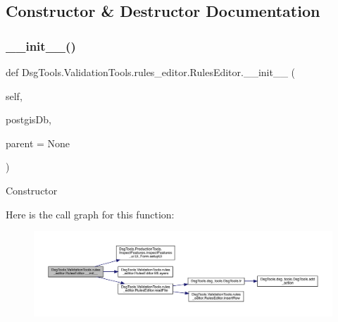 \subsection{Constructor \& Destructor Documentation}
\mbox{\label{class_dsg_tools_1_1_validation_tools_1_1rules__editor_1_1_rules_editor_adb9f3d4c402e7ce3934461fc1545935a}} 
\subsubsection{\texorpdfstring{\+\_\+\+\_\+init\+\_\+\+\_\+()}{\_\_init\_\_()}}
{\footnotesize\ttfamily def Dsg\+Tools.\+Validation\+Tools.\+rules\+\_\+editor.\+Rules\+Editor.\+\_\+\+\_\+init\+\_\+\+\_\+ (\begin{DoxyParamCaption}\item[{}]{self,  }\item[{}]{postgis\+Db,  }\item[{}]{parent = {\ttfamily None} }\end{DoxyParamCaption})}

\begin{DoxyVerb}Constructor
\end{DoxyVerb}
 Here is the call graph for this function\+:
\nopagebreak
\begin{figure}[H]
\begin{center}
\leavevmode
\includegraphics[width=350pt]{class_dsg_tools_1_1_validation_tools_1_1rules__editor_1_1_rules_editor_adb9f3d4c402e7ce3934461fc1545935a_cgraph}
\end{center}
\end{figure}


